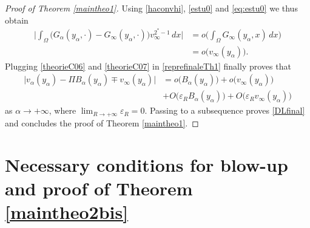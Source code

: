 \documentclass[10pt]{amsart}
\numberwithin{equation}{section}
\newcommand{\ve}{\varepsilon}
\newcommand{\Om}{\Omega}
\theoremstyle{plain}
\theoremstyle{remark}
\begin{document}
\begin{proof}[Proof of Theorem \ref{maintheo1}]
Using \eqref{haconvhi}, \eqref{estu0} and \eqref{eq:estu0} we thus obtain 
 \begin{equation} \label{theorieC07}
 \begin{aligned} 
  \Big| \int_{\Om} \Big( G_\alpha(y_\alpha, \cdot) - G_\infty(y_\alpha, \cdot) \Big)  v_\infty^{2^*-1}  \, dx \Big|   & = o \Big( \int_{\Om} G_\infty(y_\alpha, x)\, dx \Big) \\
 &  = o\big( v_\infty(y_\alpha) \big).
\end{aligned} \end{equation}
Plugging \eqref{theorieC06} and \eqref{theorieC07} in \eqref{reprefinaleTh1} finally proves that 
$$
\begin{aligned}
 \Big| v_\alpha(y_\alpha) - \Pi B_\alpha(y_\alpha) \mp v_\infty(y_\alpha) \Big| & = o \big(B_\alpha(y_\alpha) \big)+ o\big( v_\infty(y_\alpha) \big) \\
 & + O \big(\ve_R B_\alpha(y_\alpha) \Big)+ O\big( \ve_R v_\infty(y_\alpha) \big)
\end{aligned}$$
as $\alpha \to + \infty$, where $\lim_{R \to + \infty} \ve_R = 0$. Passing to a subsequence proves \eqref{DLfinal} and concludes the proof of Theorem \ref{maintheo1}.
\end{proof}
 
 	\section{Necessary conditions for blow-up and proof of Theorem \ref{maintheo2bis}}\label{secpohozaev}
		
\end{document}
